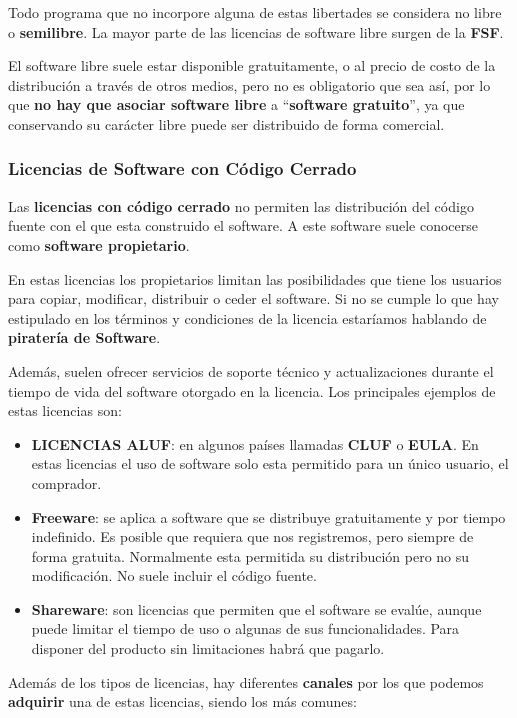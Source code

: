 Todo programa que no incorpore alguna de estas libertades se considera no libre o \textbf{semilibre}. La mayor parte de las licencias de software libre surgen de la \textbf{\gls{FSF}}.

El software libre suele estar disponible gratuitamente, o al precio de costo de la distribución a través de otros medios, pero no es obligatorio que sea así, por lo que \textbf{no hay que asociar software libre} a ``\textbf{software gratuito}'', ya que conservando su carácter libre puede ser distribuido de forma comercial.

\subsubsection{Licencias de Software con Código Cerrado}
Las \textbf{licencias con código cerrado} no permiten las distribución del código fuente con el que esta construido el software. A este software suele conocerse como \textbf{software propietario}.

En estas licencias los propietarios limitan las posibilidades que tiene los usuarios para copiar, modificar, distribuir o ceder el software. Si no se cumple lo que hay estipulado en los términos y condiciones de la licencia estaríamos hablando de \textbf{piratería de Software}.

Además, suelen ofrecer servicios de soporte técnico y actualizaciones durante el tiempo de vida del software otorgado en la licencia. Los principales ejemplos de estas licencias son:

\begin{itemize}
    \item \textbf{LICENCIAS ALUF}: en algunos países llamadas \textbf{CLUF} o \textbf{EULA}. En estas licencias el uso de software solo esta permitido para un único usuario, el comprador.
    \item \textbf{Freeware}: se aplica a software que se distribuye gratuitamente y por tiempo indefinido. Es posible que requiera que nos registremos, pero siempre de forma gratuita. Normalmente esta permitida su distribución pero no su modificación. No suele incluir el código fuente.
    \item \textbf{Shareware}: son licencias que permiten que el software se evalúe, aunque puede limitar el tiempo de uso o algunas de sus funcionalidades. Para disponer del producto sin limitaciones habrá que pagarlo.
\end{itemize}

Además de los tipos de licencias, hay diferentes \textbf{canales} por los que podemos \textbf{adquirir} una de estas licencias, siendo los más comunes:


